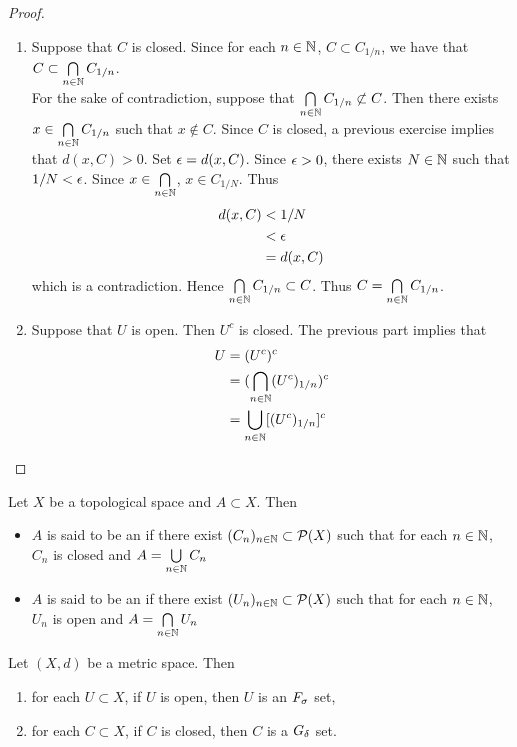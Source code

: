 \documentclass{book}
\begin{document}
\begin{proof}\
	\begin{enumerate}
		\item Suppose that $C$ is closed. Since for each $n \in \mathbb{N}$, $C \subset C_{1/n}$, we have that $C \subset \bigcap\limits_{n \in \mathbb{N}} C_{1/n}$. \\
		For the sake of contradiction, suppose that $\bigcap\limits_{n \in \mathbb{N}} C_{1/n} \not \subset C$. Then there exists $x \in \bigcap\limits_{n \in \mathbb{N}} C_{1/n}$ such that $x \not \in C$. Since $C$ is closed, a previous exercise implies that $d(x, C) > 0$. Set $\epsilon = d(x, C)$. Since $\epsilon >0$, there exists $N \in \mathbb{N}$ such that $1/N < \epsilon$. Since $x \in \bigcap\limits_{n \in \mathbb{N}}$, $x \in C_{1/N}$. Thus 
		\begin{align*}
			d(x, C)
			& < 1/N \\
			& < \epsilon \\
			& = d(x, C)
		\end{align*}
		which is a contradiction. Hence $\bigcap\limits_{n \in \mathbb{N}} C_{1/n} \subset C$. Thus $C = \bigcap\limits_{n \in \mathbb{N}} C_{1/n}$.
		\item Suppose that $U$ is open. Then $U^c$ is closed. The previous part implies that 
		\begin{align*}
			U
			& = (U^c)^c \\
			& = (\bigcap\limits_{n \in \mathbb{N}} (U^c)_{1/n})^c \\
			& = \bigcup_{n \in \mathbb{N}} [(U^c)_{1/n}]^c 
		\end{align*}
	\end{enumerate}
\end{proof}

\begin{defn} 
	Let $X$ be a topological space and $A \subset X$. Then 
	\begin{itemize}
		\item $A$ is said to be an  if there exist $(C_n)_{n \in \mathbb{N}} \subset \mathcal{P}(X)$ such that for each $n \in \mathbb{N}$, $C_n$ is closed and $A = \bigcup\limits_{n \in \mathbb{N}} C_n$
		\item $A$ is said to be an \tbf{$G_{\del}$-set} if there exist $(U_n)_{n \in \mathbb{N}} \subset \mathcal{P}(X)$ such that for each $n \in \mathbb{N}$, $U_n$ is open and $A = \bigcap\limits_{n \in \mathbb{N}} U_n$
	\end{itemize}
\end{defn}

\begin{ex} 
	Let $(X, d)$ be a metric space. Then 
	\begin{enumerate}
		\item for each $U \subset X$, if $U$ is open, then $U$ is an $F_{\sigma}$ set,
		\item for each $C \subset X$, if $C$ is closed, then $C$ is a $G_{\del}$ set.
	\end{enumerate}
\end{ex}
\end{document}
